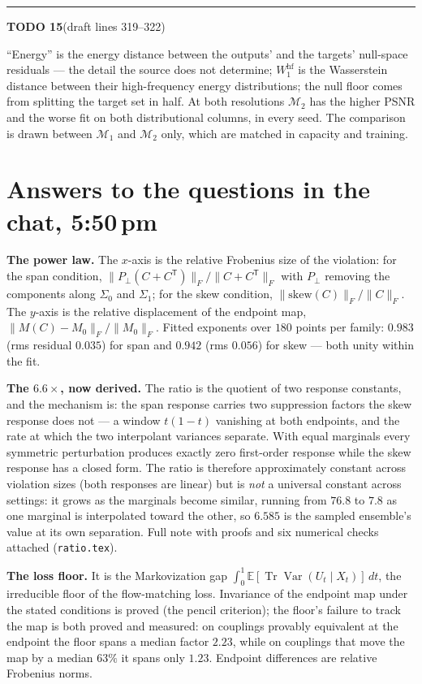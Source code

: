 \documentclass[11pt]{article}
\newcommand{\M}{\mathcal M}
\newcommand{\T}{\mathsf{T}}
\newenvironment{todoitem}[2]{%
  \par\medskip\noindent\rule{\textwidth}{0.7pt}\par\nobreak\smallskip
  \noindent\textbf{\large TODO #1}\quad\textnormal{\small(draft #2)}\par\nobreak\smallskip
}{\par\medskip}
\begin{document}
\begin{todoitem}{15}{lines 319--322}
{``Energy'' is the energy distance between the outputs' and the targets' null-space residuals ---
the detail the source does not determine; $W_1^{\mathrm{hf}}$ is the Wasserstein distance between
their high-frequency energy distributions; the null floor comes from splitting the target set in
half. At both resolutions $\M_2$ has the higher PSNR and the worse fit on both distributional
columns, in every seed. The comparison is drawn between $\M_1$ and $\M_2$ only, which are matched
in capacity and training.}
\end{todoitem}

\section*{Answers to the questions in the chat, 5:50\,pm}

\textbf{The power law.} The $x$-axis is the relative Frobenius size of the violation: for the
span condition, $\|P_\perp(C+C^{\T})\|_F/\|C+C^{\T}\|_F$ with $P_\perp$ removing the components
along $\Sigma_0$ and $\Sigma_1$; for the skew condition, $\|\mathrm{skew}(C)\|_F/\|C\|_F$. The
$y$-axis is the relative displacement of the endpoint map,
$\|M(C)-M_0\|_F/\|M_0\|_F$. Fitted exponents over $180$ points per family: $0.983$
(rms residual $0.035$) for span and $0.942$ (rms $0.056$) for skew --- both unity within the
fit.

\textbf{The $6.6\times$, now derived.} The ratio is the quotient of two response constants, and
the mechanism is: the span response carries two suppression factors the skew response does not
--- a window $t(1-t)$ vanishing at both endpoints, and the rate at which the two interpolant
variances separate. With equal marginals every symmetric perturbation produces exactly zero
first-order response while the skew response has a closed form. The ratio is therefore
approximately constant across violation sizes (both responses are linear) but is \emph{not} a
universal constant across settings: it grows as the marginals become similar, running from $76.8$
to $7.8$ as one marginal is interpolated toward the other, so $6.585$ is the sampled ensemble's
value at its own separation. Full note with proofs and six numerical checks attached
(\texttt{ratio.tex}).

\textbf{The loss floor.} It is the Markovization gap
$\int_0^1\mathbb E[\operatorname{Tr}\operatorname{Var}(U_t\mid X_t)]\,dt$, the irreducible floor
of the flow-matching loss. Invariance of the endpoint map under the stated conditions is proved
(the pencil criterion); the floor's failure to track the map is both proved and measured: on
couplings provably equivalent at the endpoint the floor spans a median factor $2.23$, while on
couplings that move the map by a median $63\%$ it spans only $1.23$. Endpoint differences are
relative Frobenius norms.
\end{document}

